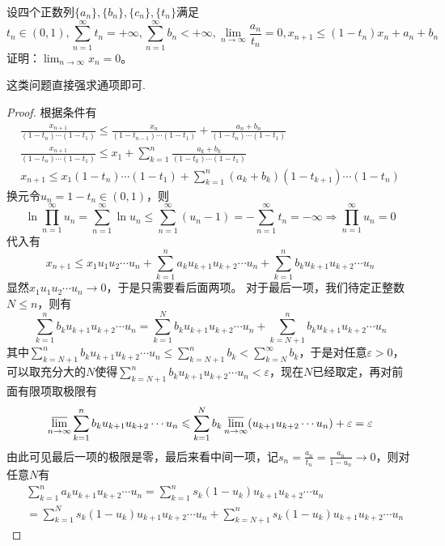 \documentclass[../../main.tex]{subfiles}%
\begin{document}
\begin{example}
设四个正数列\(\{a_n\},\{b_n\},\{c_n\},\{t_n\}\)满足
\[t_n\in(0,1),\sum_{n = 1}^{\infty}t_n=+\infty,\sum_{n = 1}^{\infty}b_n<+\infty,\lim_{n\rightarrow\infty}\frac{a_n}{t_n}=0,x_{n + 1}\leqslant (1 - t_n)x_n+a_n + b_n\]
证明：\(\lim_{n\rightarrow\infty}x_n = 0\)。
\end{example}
\begin{note}
这类问题直接强求通项即可.
\end{note}
\begin{proof}
根据条件有
\begin{gather*}
\frac{x_{n + 1}}{(1 - t_n)\cdots(1 - t_1)}\leqslant \frac{x_n}{(1 - t_{n-1})\cdots(1 - t_1)}+\frac{a_n + b_n}{(1 - t_n)\cdots(1 - t_1)}\\
\frac{x_{n + 1}}{(1 - t_n)\cdots(1 - t_1)}\leqslant  x_1+\sum_{k = 1}^{n}\frac{a_k + b_k}{(1 - t_k)\cdots(1 - t_1)}\\
x_{n + 1}\leqslant  x_1(1 - t_n)\cdots(1 - t_1)+\sum_{k = 1}^{n}(a_k + b_k)(1 - t_{k + 1})\cdots(1 - t_n)
\end{gather*}
换元令\(u_n = 1 - t_n\in(0,1)\)，则
\[\ln\prod_{n = 1}^{\infty}u_n=\sum_{n = 1}^{\infty}\ln u_n\leqslant \sum_{n = 1}^{\infty}(u_n - 1)=-\sum_{n = 1}^{\infty}t_n=-\infty\Rightarrow\prod_{n = 1}^{\infty}u_n = 0\]
代入有
\[x_{n + 1}\leqslant  x_1u_1u_2\cdots u_n+\sum_{k = 1}^{n}a_ku_{k + 1}u_{k + 2}\cdots u_n+\sum_{k = 1}^{n}b_ku_{k + 1}u_{k + 2}\cdots u_n\]
显然\(x_1u_1u_2\cdots u_n\rightarrow0\)，于是只需要看后面两项。
对于最后一项，我们待定正整数\(N\leqslant  n\)，则有
\[\sum_{k = 1}^{n}b_ku_{k + 1}u_{k + 2}\cdots u_n=\sum_{k = 1}^{N}b_ku_{k + 1}u_{k + 2}\cdots u_n+\sum_{k = N + 1}^{n}b_ku_{k + 1}u_{k + 2}\cdots u_n\]
其中\(\sum_{k = N + 1}^{n}b_ku_{k + 1}u_{k + 2}\cdots u_n\leqslant \sum_{k = N + 1}^{n}b_k<\sum_{k = N}^{\infty}b_k\)，于是对任意\(\varepsilon>0\)，可以取充分大的\(N\)使得\(\sum_{k = N + 1}^{n}b_ku_{k + 1}u_{k + 2}\cdots u_n<\varepsilon\)，现在\(N\)已经取定，再对前面有限项取极限有
\[\varlimsup_{n\rightarrow\infty}\sum_{k = 1}^{n}b_ku_{k + 1}u_{k + 2}\cdots u_n\leqslant \sum_{k = 1}^{N}b_k\varlimsup_{n\rightarrow\infty}(u_{k + 1}u_{k + 2}\cdots u_n)+\varepsilon=\varepsilon\]
由此可见最后一项的极限是零，最后来看中间一项，记\(s_n=\frac{a_n}{t_n}=\frac{a_n}{1 - u_n}\rightarrow0\)，则对任意\(N\)有
\begin{align*}
&\sum_{k = 1}^{n}a_ku_{k + 1}u_{k + 2}\cdots u_n=\sum_{k = 1}^{n}s_k(1 - u_k)u_{k + 1}u_{k + 2}\cdots u_n\\
&=\sum_{k = 1}^{N}s_k(1 - u_k)u_{k + 1}u_{k + 2}\cdots u_n+\sum_{k = N + 1}^{n}s_k(1 - u_k)u_{k + 1}u_{k + 2}\cdots u_n

\end{align*}
\end{proof}
\end{document}
